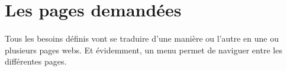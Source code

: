 \section{Les pages demandées}
\label{subsec:requested-pages}

\paragraph{}
Tous les besoins définis vont se traduire d'une manière ou l'autre en une ou plusieurs pages webs.
Et évidemment, un menu permet de naviguer entre les différentes pages.










